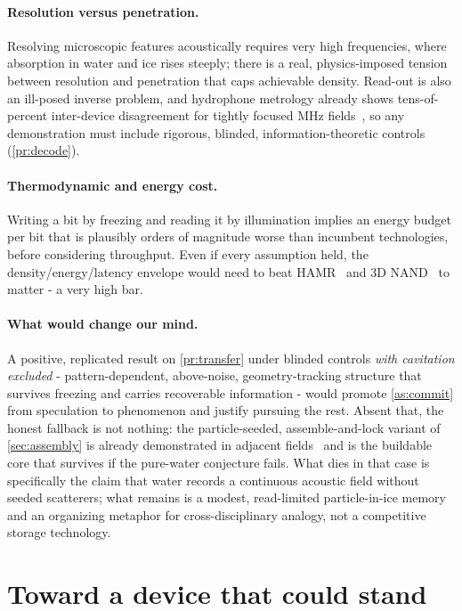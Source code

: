 \documentclass[11pt]{article}
\theoremstyle{definition}
\begin{document}
\paragraph{Resolution versus penetration.}
Resolving microscopic features acoustically requires very high frequencies, where absorption
in water and ice rises steeply; there is a real, physics-imposed tension between resolution
and penetration that caps achievable density. Read-out is also an ill-posed inverse problem,
and hydrophone metrology already shows tens-of-percent inter-device disagreement for tightly
focused MHz fields~\cite{martin2019hydrophone}, so any demonstration must include rigorous,
blinded, information-theoretic controls (\cref{pr:decode}).

\paragraph{Thermodynamic and energy cost.}
Writing a bit by freezing and reading it by illumination implies an energy budget per bit
that is plausibly orders of magnitude worse than incumbent technologies, before considering
throughput. Even if every assumption held, the density/energy/latency envelope would need to
beat HAMR~\cite{kryder2008hamr} and 3D NAND~\cite{goda2020} to matter - a very high bar.

\paragraph{What would change our mind.}
A positive, replicated result on \cref{pr:transfer} under blinded controls \emph{with
cavitation excluded} - pattern-dependent, above-noise, geometry-tracking structure that
survives freezing and carries recoverable information - would promote \cref{as:commit} from
speculation to phenomenon and justify pursuing the rest. Absent that, the honest fallback is
not nothing: the particle-seeded, assemble-and-lock variant of \cref{sec:assembly} is already
demonstrated in adjacent fields~\cite{melde2023assembly,olofsson2021hydrogel} and is the
buildable core that survives if the pure-water conjecture fails. What dies in that case is
specifically the claim that water records a continuous acoustic field without seeded
scatterers; what remains is a modest, read-limited particle-in-ice memory and an organizing
metaphor for cross-disciplinary analogy, not a competitive storage technology.

\section{Toward a device that could stand}
\label{sec:device}
\end{document}
